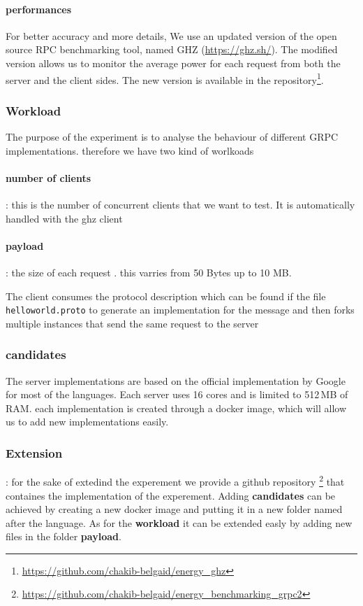\paragraph{performances}
For better accuracy and more details, We use an updated version of the open source RPC benchmarking tool, named GHZ (\url{https://ghz.sh/}).
The modified version allows us to monitor the average power for each request from both the server and the client sides.
The new version is available in the repository\footnote{\url{https://github.com/chakib-belgaid/energy_ghz}}.

\subsubsection{Workload}
The purpose of the experiment is to analyse the behaviour of different GRPC implementations. therefore we have two kind of worlkoads 
\paragraph{number of clients}: this is the number of concurrent clients that we want to test. It is automatically handled with the ghz client 
\paragraph{payload}: the size of each request . this varries from 50 Bytes up to 10 MB.

The client consumes the protocol description which can be found if the file \texttt{helloworld.proto} to generate an implementation for the message  and then forks multiple instances that send the same request to the server 

\subsubsection*{candidates}
The server implementations are based on the official implementation by Google for most of the languages.
Each server uses 16 cores and is limited to 512\,MB of RAM.
each implementation is created through a docker image, which will allow us to add new implementations easily.

\subsubsection{Extension}: 
for the sake of extedind the experement we provide a github repository \footnote{\url{https://github.com/chakib-belgaid/energy_benchmarking_grpc2}} that containes the implementation of the experement.
Adding \textbf{candidates} can be achieved by creating a new docker image and putting it in a new folder named after the language.
As for the \textbf{workload} it can be extended easly by adding new files in the folder \textbf{payload}.
 



